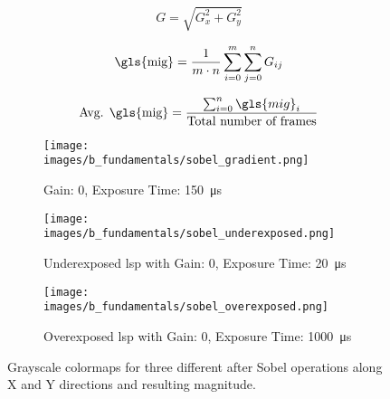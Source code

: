     \begin{equation}
        G = \sqrt{G_x^2 + G_y^2}
        \label{eqn:mag_eqn}
    \end{equation}

    \begin{equation}
        \text{\gls{mig}} = \frac{1}{m \cdot n} \sum_{i=0}^{m} \sum_{j=0}^{n} G_{ij}
        \label{eqn:mig}
    \end{equation}

    \begin{equation}
        \text{Avg. \gls{mig}} = \frac{\sum_{i=0}^{n} \gls{mig}_i}{\text{Total number of frames}}
        \label{eqn:avg_mig}
    \end{equation}

    \begin{figure}[h]
        \centering
        \begin{subfigure}[b]{0.95\textwidth}
            \centering
            \texttt{[image: images/b\_fundamentals/sobel\_gradient.png]}
            \caption{Gain: 0, Exposure Time: \SI{150}{\micro\second}}
            \label{fig:sobel_gradient.png}
        \end{subfigure}
        \begin{subfigure}[b]{0.95\textwidth}
            \centering
            \texttt{[image: images/b\_fundamentals/sobel\_underexposed.png]}
            \caption{Underexposed \gls{lsp} with Gain: 0, Exposure Time: \SI{20}{\micro\second}}
            \label{fig:sobel_underexposed.png}
        \end{subfigure}
        \begin{subfigure}[b]{0.95\textwidth}
            \centering
            \texttt{[image: images/b\_fundamentals/sobel\_overexposed.png]}
            \caption{Overexposed \gls{lsp} with Gain: 0, Exposure Time: \SI{1000}{\micro\second}}
            \label{fig:sobel_overexposed.png}
        \end{subfigure}
        \caption{Grayscale colormaps for three different  after Sobel operations along X and Y directions and resulting magnitude.}
        \label{fig:sobel.png}
    \end{figure} 